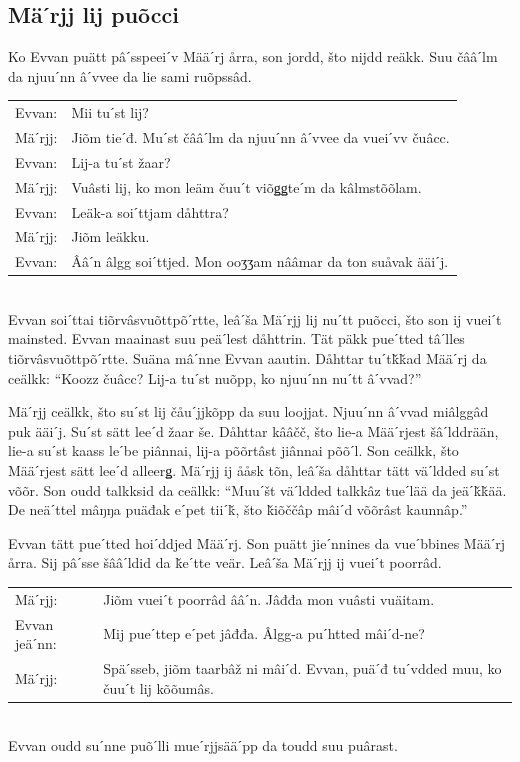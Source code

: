 \documentclass{scrbook}
\begin{document}
\subsection*{Mäˊrjj lij puõcci}
Ko Evvan puätt pâˊsspeeiˊv Määˊrj årra, son jordd, što nijdd reäkk. Suu čââˊlm da njuuˊnn âˊvvee da lie sami ruõpssâd.\\

\begin{tabularx}{\textwidth}{l X}
Evvan:& 	Mii tuˊst lij?\\
Mäˊrjj:& 	Jiõm tieˊđ. Muˊst čââˊlm da njuuˊnn âˊvvee da vueiˊvv čuâcc.\\
Evvan:&	Lij-a tuˊst žaar?\\
Mäˊrjj:&	Vuâsti lij, ko mon leäm čuuˊt viõǥǥteˊm da kâlmstõõlam.\\
Evvan:&	Leäk-a soiˊttjam dåhttra?\\
Mäˊrjj:&	Jiõm leäkku.\\
Evvan:&	Ââˊn âlgg soiˊttjed. Mon ooʒʒam nââmar da ton suåvak ääiˊj.\\
\end{tabularx}\\

Evvan soiˊttai tiõrvâsvuõttpõˊrtte, leâˊša Mäˊrjj lij nuˊtt puõcci, što son ij vueiˊt mainsted. Evvan maainast suu peäˊlest dåhttrin. Tät päkk pueˊtted tâˊlles tiõrvâsvuõttpõˊrtte. Suäna mâˊnne Evvan aautin. Dåhttar tuˊtǩǩad Määˊrj da ceälkk: “Koozz čuâcc? Lij-a tuˊst nuõpp, ko njuuˊnn nuˊtt âˊvvad?”

Mäˊrjj ceälkk, što suˊst lij čåuˊjjkõpp da suu loojjat. Njuuˊnn âˊvvad miâlggâd puk ääiˊj. Suˊst sätt leeˊd žaar še. Dåhttar kââčč, što lie-a Määˊrjest šâˊlddrään, lie-a suˊst kaass leˊbe piânnai, lij-a põõrtâst jiânnai põõˊl. Son ceälkk, što Määˊrjest sätt leeˊd alleerǥ. Mäˊrjj ij ååsk tõn, leâˊša dåhttar tätt väˊldded suˊst võõr. Son oudd talkksid da ceälkk: “Muuˊšt väˊldded talkkâz tueˊlää da jeäˊǩǩää. De neäˊttel mâŋŋa puäđak eˊpet tiiˊǩ, što ǩiõččâp mâiˊd võõrâst kaunnâp.”

Evvan tätt pueˊtted hoiˊddjed Määˊrj. Son puätt jieˊnnines da vueˊbbines Määˊrj årra. Sij pâˊsse šââˊldid da ǩeˊtte veär. Leâˊša Mäˊrjj ij vueiˊt poorrâd.\\

\begin{tabularx}{\textwidth}{l X}
Mäˊrjj:& 	Jiõm vueiˊt poorrâd ââˊn. Jâđđa mon vuâsti vuäitam.\\
Evvan jeäˊnn:&	Mij pueˊttep eˊpet jâđđa. Âlgg-a puˊhtted mâiˊd-ne?\\
Mäˊrjj:&	Späˊsseb, jiõm taarbâž ni mâiˊd. Evvan, puäˊđ tuˊvdded muu, ko čuuˊt lij kõõumâs.\\
\end{tabularx}\\

Evvan oudd suˊnne puõˊlli mueˊrjjsääˊpp da toudd suu puârast.
\end{document}
